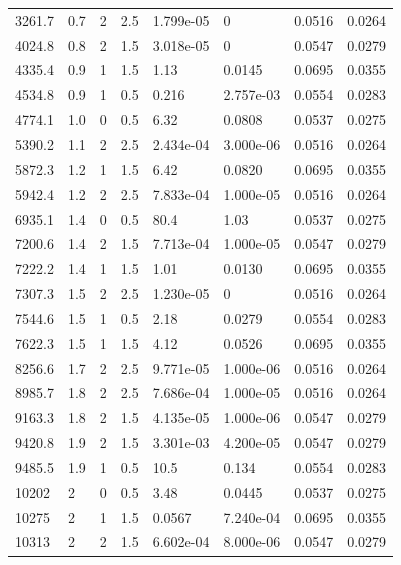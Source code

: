 \documentclass[preview]{standalone}
\begin{document}
{{\begin{tabular}{L{1.2cm}C{1.2cm} C{0.3cm}C{0.5cm} C{1.4cm}C{1.4cm} C{1.4cm}C{1.4cm}}
  3261.7  &   0.7  & 2     & 2.5 &  1.799e-05  & 0  & 0.0516 &  0.0264   \\ 
  4024.8  &   0.8  & 2     & 1.5 &  3.018e-05  & 0  & 0.0547 &  0.0279   \\ 
  4335.4  &   0.9  & 1     & 1.5 &  1.13  & 0.0145  & 0.0695 &  0.0355   \\ 
  4534.8  &   0.9  & 1     & 0.5 &  0.216  & 2.757e-03  & 0.0554 &  0.0283   \\ 
  4774.1  &   1.0  & 0     & 0.5 &  6.32  & 0.0808  & 0.0537 &  0.0275   \\ 
  5390.2  &   1.1  & 2     & 2.5 &  2.434e-04  & 3.000e-06  & 0.0516 &  0.0264   \\ 
  5872.3  &   1.2  & 1     & 1.5 &  6.42  & 0.0820  & 0.0695 &  0.0355   \\ 
  5942.4  &   1.2  & 2     & 2.5 &  7.833e-04  & 1.000e-05  & 0.0516 &  0.0264   \\ 
  6935.1  &   1.4  & 0     & 0.5 &  80.4  & 1.03  & 0.0537 &  0.0275   \\ 
  7200.6  &   1.4  & 2     & 1.5 &  7.713e-04  & 1.000e-05  & 0.0547 &  0.0279   \\ 
  7222.2  &   1.4  & 1     & 1.5 &  1.01  & 0.0130  & 0.0695 &  0.0355   \\ 
  7307.3  &   1.5  & 2     & 2.5 &  1.230e-05  & 0  & 0.0516 &  0.0264   \\ 
  7544.6  &   1.5  & 1     & 0.5 &  2.18  & 0.0279  & 0.0554 &  0.0283   \\ 
  7622.3  &   1.5  & 1     & 1.5 &  4.12  & 0.0526  & 0.0695 &  0.0355   \\ 
  8256.6  &   1.7  & 2     & 2.5 &  9.771e-05  & 1.000e-06  & 0.0516 &  0.0264   \\ 
  8985.7  &   1.8  & 2     & 2.5 &  7.686e-04  & 1.000e-05  & 0.0516 &  0.0264   \\ 
  9163.3  &   1.8  & 2     & 1.5 &  4.135e-05  & 1.000e-06  & 0.0547 &  0.0279   \\ 
  9420.8  &   1.9  & 2     & 1.5 &  3.301e-03  & 4.200e-05  & 0.0547 &  0.0279   \\ 
  9485.5  &   1.9  & 1     & 0.5 &  10.5  & 0.134  & 0.0554 &  0.0283   \\ 
  10202  &     2  & 0     & 0.5 &  3.48  & 0.0445  & 0.0537 &  0.0275   \\ 
  10275  &     2  & 1     & 1.5 &  0.0567  & 7.240e-04  & 0.0695 &  0.0355   \\ 
  10313  &     2  & 2     & 1.5 &  6.602e-04  & 8.000e-06  & 0.0547 &  0.0279   \\ 

\end{tabular}}}
\end{document}
